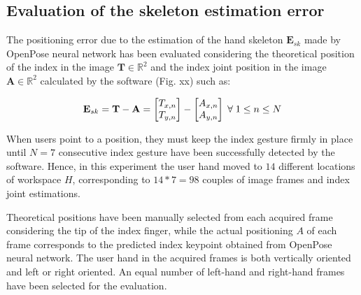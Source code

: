 \documentclass[a4paper, 10 pt, conference]{ieeeconf}      %
\begin{document}
\subsection{Evaluation of the skeleton estimation error}

The positioning error due to the estimation of the hand skeleton $\mathbf{E}_{sk}$ made by OpenPose neural network has been evaluated considering the theoretical position of the index in the image $\mathbf{T} \in \mathbb{R}^2$ and the index joint position in the image $\mathbf{A} \in \mathbb{R}^2$ calculated by the software (Fig. xx) such as:

\begin{equation}
\mathbf{E}_{sk} = \mathbf{T} - \mathbf{A} = \begin{bmatrix}
T_{x,n}\\
T_{y,n}
\end{bmatrix}-
\begin{bmatrix}
A_{x,n}\\
A_{y,n}
\end{bmatrix}
\thickspace
\forall \thickspace 1 \leq n \leq N
\end{equation}

When users point to a position, they must keep the index gesture firmly in place until $N = 7$ consecutive index gesture have been successfully detected by the software. Hence, in this experiment the user hand moved to $14$ different locations of workspace $H$, corresponding to $14 * 7 = 98$ couples of image frames and index joint estimations.

Theoretical positions have been manually selected from each acquired frame considering the tip of the index finger, while the actual positioning $A$ of each frame corresponds to the predicted index keypoint obtained from OpenPose neural network. The user hand in the acquired frames is both vertically oriented and left or right oriented. An equal number of left-hand and right-hand frames have been selected for the evaluation.
\end{document}
